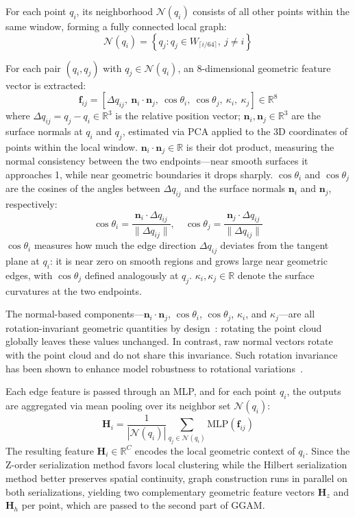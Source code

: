 \documentclass[letterpaper,journal]{IEEEtran}
\begin{document}
For each point $q_i$, its neighborhood $\mathcal{N}(q_i)$ consists of all other points within the same window, forming a fully connected local graph:
\begin{equation}
\mathcal{N}(q_i) = \left\{q_j : q_j \in W_{\lceil i/64 \rceil},\ j \neq i\right\}
\end{equation}

For each pair $(q_i, q_j)$ with $q_j \in \mathcal{N}(q_i)$, an 8-dimensional geometric feature vector is extracted:
\begin{equation}
\mathbf{f}_{ij} = [\Delta q_{ij},\ \mathbf{n}_i \cdot \mathbf{n}_j,\ \cos\theta_i,\ \cos\theta_j,\ \kappa_i,\ \kappa_j] \in \mathbb{R}^8
\end{equation}
where $\Delta q_{ij} = q_j - q_i \in \mathbb{R}^3$ is the relative position vector; $\mathbf{n}_i, \mathbf{n}_j \in \mathbb{R}^3$ are the surface normals at $q_i$ and $q_j$, estimated via PCA applied to the 3D coordinates of points within the local window. $\mathbf{n}_i \cdot \mathbf{n}_j \in \mathbb{R}$ is their dot product, measuring the normal consistency between the two endpoints—near smooth surfaces it approaches 1, while near geometric boundaries it drops sharply. $\cos\theta_i$ and $\cos\theta_j$ are the cosines of the angles between $\Delta q_{ij}$ and the surface normals $\mathbf{n}_i$ and $\mathbf{n}_j$, respectively:
\begin{equation}
\cos\theta_i = \frac{\mathbf{n}_i \cdot \Delta q_{ij}}{\|\Delta q_{ij}\|}, \quad \cos\theta_j = \frac{\mathbf{n}_j \cdot \Delta q_{ij}}{\|\Delta q_{ij}\|}
\end{equation}
$\cos\theta_i$ measures how much the edge direction $\Delta q_{ij}$ deviates from the tangent plane at $q_i$: it is near zero on smooth regions and grows large near geometric edges, with $\cos\theta_j$ defined analogously at $q_j$. $\kappa_i, \kappa_j \in \mathbb{R}$ denote the surface curvatures at the two endpoints.

The normal-based components—$\mathbf{n}_i \cdot \mathbf{n}_j$, $\cos\theta_i$, $\cos\theta_j$, $\kappa_i$, and $\kappa_j$—are all rotation-invariant geometric quantities by design~\cite{clusterNet, riconv}: rotating the point cloud globally leaves these values unchanged. In contrast, raw normal vectors rotate with the point cloud and do not share this invariance. Such rotation invariance has been shown to enhance model robustness to rotational variations~\cite{clusterNet, riconv}.

Each edge feature is passed through an MLP, and for each point $q_i$, the outputs are aggregated via mean pooling over its neighbor set $\mathcal{N}(q_i)$:
\begin{equation}
\mathbf{H}_i = \frac{1}{|\mathcal{N}(q_i)|} \sum_{q_j \in \mathcal{N}(q_i)} \text{MLP}(\mathbf{f}_{ij})
\end{equation}
The resulting feature $\mathbf{H}_i \in \mathbb{R}^C$ encodes the local geometric context of $q_i$. Since the Z-order serialization method favors local clustering while the Hilbert serialization method better preserves spatial continuity, graph construction runs in parallel on both serializations, yielding two complementary geometric feature vectors $\mathbf{H}_z$ and $\mathbf{H}_h$ per point, which are passed to the second part of GGAM.
\end{document}
